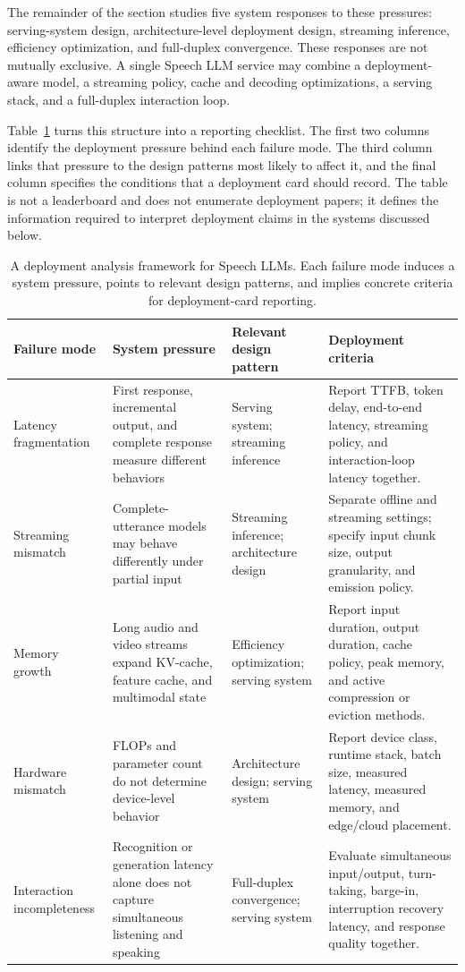 The remainder of the section studies five system responses to these pressures: serving-system design, architecture-level deployment design, streaming inference, efficiency optimization, and full-duplex convergence. These responses are not mutually exclusive. A single Speech LLM service may combine a deployment-aware model, a streaming policy, cache and decoding optimizations, a serving stack, and a full-duplex interaction loop.

Table~\ref{tab:deployment-framework} turns this structure into a reporting checklist. The first two columns identify the deployment pressure behind each failure mode. The third column links that pressure to the design patterns most likely to affect it, and the final column specifies the conditions that a deployment card should record. The table is not a leaderboard and does not enumerate deployment papers; it defines the information required to interpret deployment claims in the systems discussed below.

\begin{table}[t]
\centering
\caption{A deployment analysis framework for Speech LLMs. Each failure mode induces a system pressure, points to relevant design patterns, and implies concrete criteria for deployment-card reporting.}
\label{tab:deployment-framework}
\footnotesize
\setlength{\tabcolsep}{3pt}
\begin{tabularx}{\textwidth}{>{\raggedright\arraybackslash}p{} >{\raggedright\arraybackslash}p{} >{\raggedright\arraybackslash}p{} X}
\toprule
Failure mode & System pressure & Relevant design pattern & Deployment criteria \\
\midrule
Latency fragmentation & First response, incremental output, and complete response measure different behaviors & Serving system; streaming inference & Report TTFB, token delay, end-to-end latency, streaming policy, and interaction-loop latency together. \\
Streaming mismatch & Complete-utterance models may behave differently under partial input & Streaming inference; architecture design & Separate offline and streaming settings; specify input chunk size, output granularity, and emission policy. \\
Memory growth & Long audio and video streams expand KV-cache, feature cache, and multimodal state & Efficiency optimization; serving system & Report input duration, output duration, cache policy, peak memory, and active compression or eviction methods. \\
Hardware mismatch & FLOPs and parameter count do not determine device-level behavior & Architecture design; serving system & Report device class, runtime stack, batch size, measured latency, measured memory, and edge/cloud placement. \\
Interaction incompleteness & Recognition or generation latency alone does not capture simultaneous listening and speaking & Full-duplex convergence; serving system & Evaluate simultaneous input/output, turn-taking, barge-in, interruption recovery latency, and response quality together. \\
\bottomrule
\end{tabularx}
\end{table}

